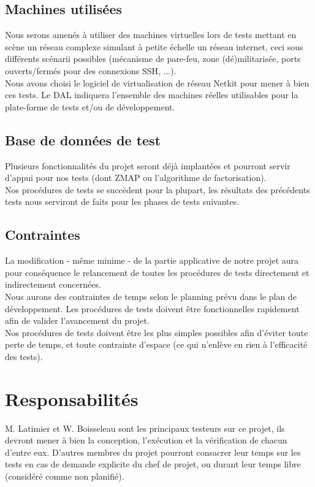 \documentclass[a4paper,11pt,french]{article}
\begin{document}
\subsection{Machines utilisées}

Nous serons amenés à utiliser des machines virtuelles lors de tests mettant en scène un réseau complexe simulant à petite échelle un réseau internet, ceci sous différents scénarii possibles (mécanisme de pare-feu, zone (dé)militarisée, ports ouverts/fermés pour des connexions SSH, ...). \\

Nous avons choisi le logiciel de virtualisation de réseau Netkit pour mener à bien ces tests. Le DAL indiquera l'ensemble des machines réelles utilisables pour la plate-forme de tests et/ou de développement.

\subsection{Base de données de test}

Plusieurs fonctionnalités du projet seront déjà implantées et pourront servir d'appui pour nos tests (dont ZMAP ou l'algorithme de factorisation).\\

Nos procédures de tests se succèdent pour la plupart, les résultats des précédents tests nous serviront de faits pour les phases de tests suivantes.

\subsection{Contraintes}

La modification - même minime - de la partie applicative de notre projet aura pour conséquence le relancement de toutes les procédures de tests directement et indirectement concernées.\\

Nous aurons des contraintes de temps selon le planning prévu dans le plan de développement. Les procédures de tests doivent être fonctionnelles rapidement afin de valider l'avancement du projet.\\

Nos procédures de tests doivent être les plus simples possibles afin d'éviter toute perte de temps, et toute contrainte d'espace (ce qui n'enlève en rien à l'efficacité des tests).


\section{Responsabilités}
M. Latimier et W. Boisseleau sont les principaux testeurs sur ce projet, ils devront mener à bien la conception, l'exécution et la vérification de chacun d'entre eux. D'autres membres du projet pourront consacrer leur temps sur les tests en cas de demande explicite du chef de projet, ou durant leur temps libre (considéré comme non planifié).\\
\end{document}
